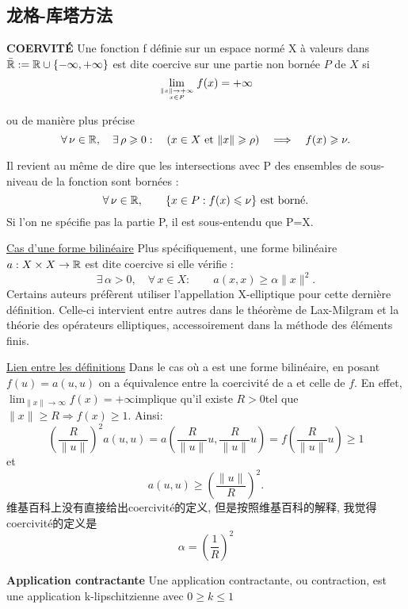 \documentclass{book}
\begin{document}
\subsection{龙格-库塔方法}

\textbf{COERVIT\'E}
Une fonction f d\'efinie sur un espace norm\'e X \`a valeurs dans $ \bar{\mathbb{R}}:=\mathbb{R}\cup\{-\infty,+\infty\}$ est dite coercive sur une partie non born\'ee $ P$ de $X$ si
$$ \lim_{\mytop{\| x\| \to +\infty}{x\in P}}f(x)=+\infty $$

ou de mani\`ere plus pr\'ecise
$$ \forall\,\nu\in\mathbb{R},\quad \exists\,\rho\geqslant0:\quad (x\in X ~\mbox{et}~ \|x\|\geqslant\rho) \quad\Longrightarrow\quad f(x)\geqslant\nu.  $$

Il revient au m\^eme de dire que les intersections avec P des ensembles de sous-niveau de la fonction sont born\'ees :
$$ \forall\,\nu\in\mathbb{R},\qquad\{x\in P: f(x)\leqslant\nu\}~\mbox{est born\'e.} $$
Si l'on ne sp\'ecifie pas la partie P, il est sous-entendu que P=X.

\underline{Cas d'une forme bilin\'eaire} \newline
Plus sp\'ecifiquement, une forme bilin\'eaire $a:X\times X\to\mathbb{R}$ est dite coercive si elle v\'erifie :
$$ \exists\,\alpha>0,\quad\forall\,x\in X:\qquad a(x,x) \geqslant \alpha\|x\|^2.  $$
Certains auteurs pr\'ef\`erent utiliser l'appellation X-elliptique pour cette derni\`ere d\'efinition.
Celle-ci intervient entre autres dans le th\'eor\`eme de Lax-Milgram et la th\'eorie des op\'erateurs elliptiques,
accessoirement dans la m\'ethode des \'el\'ements finis.

\underline{Lien entre les d\'efinitions}\newline
Dans le cas o\`u a est une forme bilin\'eaire, en posant $f(u)=a(u,u)$ on a \'equivalence entre la coercivit\'e de a et celle de $f$.
En effet, $\scriptstyle\lim_{\| x\|\to\infty}f(x)=+\infty $implique qu'il existe $R>0 $tel que $\scriptstyle\|x\|\geqslant R\Rightarrow f(x)\geqslant 1$. Ainsi:
$$ \left(\frac{R}{\|u\|}\right)^2a(u,u)=a\left(\frac{R}{\|u\|}u,\frac{R}{\|u\|}u\right)=f\left(\frac{R}{\|u\|}u\right)\geqslant 1 $$
et
$$ a(u,u)\geqslant\left(\frac{\|u\|}{R}\right)^2.  $$
维基百科上没有直接给出coercivit\'e的定义, 但是按照维基百科的解释, 我觉得coercivit\'e的定义是
$$ \alpha=\left(\frac{1}{R}\right)^2 $$

\bigskip
\textbf{Application contractante}\newline
Une application contractante, ou contraction, est une application k-lipschitzienne avec $0 \geq k \le 1$
\bigskip
\end{document}
